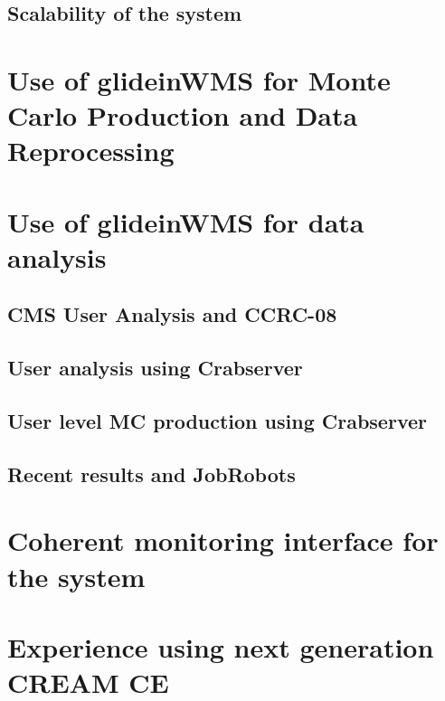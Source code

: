 \documentclass[a4paper]{jpconf}
\begin{document}
\subsection {Scalability of the system}



\section{Use of glideinWMS for Monte Carlo Production and Data Reprocessing }



\section{Use of glideinWMS for data analysis}



\subsection{CMS User Analysis and CCRC-08}



\subsection{User analysis using Crabserver}



\subsection{User level MC production using Crabserver}



\subsection{Recent results and JobRobots}



\section{Coherent monitoring interface for the system}



\section{Experience using next generation CREAM CE}
\end{document}
